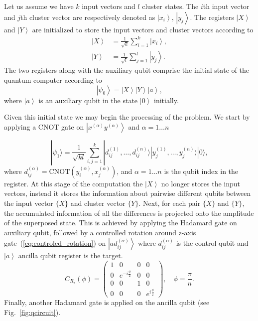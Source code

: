 \documentclass[pra,showkeys,twocolumn,showpacs]{revtex4-1}
\begin{document}
Let us assume we have $k$ input vectors and $l$ cluster states. 
The $i$th input vector and $j$th cluster vector are respectively denoted as $\left| x_i \right\rangle$, $\left| y_j \right\rangle$. 
The registers $\left| X \right\rangle$ and $\left| Y \right\rangle$ are initialized to store the input vectors and cluster vectors according to
%
\begin{align}
    \label{eq:encodnig}
    \left| X \right\rangle  & = \frac{1}{\sqrt{k}} \sum\limits_{i=1}^{k} \left| x_i \right\rangle,  \\
    \left| Y \right\rangle&  = \frac{1}{\sqrt{l}} \sum\limits_{j=1}^{l} \left| y_j \right\rangle .
\end{align}
% 
The two registers along with the auxiliary qubit comprise the initial state of the quantum computer according to
%
\begin{equation} 
    \label{eq:initial_state}
	\left| \psi_0 \right\rangle = 
    \left| X \right\rangle
    \left| Y \right\rangle 
    \left| a \right\rangle ,
\end{equation}
%
where $\left| a \right\rangle$ is an auxiliary qubit in the state $\left| 0 \right\rangle$ initially.

Given this initial state we may begin the processing of the problem. We start by applying a CNOT gate on $\left| x^{(\alpha)} y^{(\alpha)} \right\rangle$ and $\alpha = 1 \dots n$

\begin{equation}
    | \psi_1 \rangle  =  
    \frac{1}{\sqrt{kl}} \sum_{i, j=1}^{k} 
    | d^{(1)}_{ij}, \dots, d^{(n)}_{ij} \rangle 
    | y^{(1)}_j, \dots, y^{(n)}_j \rangle
    | 0 \rangle ,
\end{equation}
%
where $d^{(\alpha)}_{ij} = \mathrm{CNOT}(y^{(\alpha)}_i, x^{(\alpha)}_j)$, and $\alpha = 1 \dots n$  is the qubit index in the register. 
At this stage of the computation the $\left| X \right\rangle$ no longer stores the input vectors,
instead it stores the information about pairwise different qubits between the input vector $\{X\}$ and cluster vector $\{Y\}$. 
Next, for each pair $\{X\}$ and $\{Y\}$, the accumulated information of all the differences is projected onto the amplitude of the superposed state. 
This is achieved by applying the Hadamard gate on auxiliary qubit, 
followed by a controlled rotation around z-axis gate~(\ref{eq:controled_rotation}) on $\left|a d_{ij}^{(\alpha)}\right\rangle$ 
where $d_{ij}^{(\alpha)}$ is the control qubit and $\left| a \right\rangle$ ancilla qubit register is the target.
%
\begin{equation}
    \label{eq:controled_rotation}
    C_{R_z}(\phi) = 
    \begin{pmatrix}
        1 & 0 & 0 & 0 \\
        0 & e^{-i \frac \phi 2} & 0 & 0 \\
        0 & 0 & 1 & 0 \\
		0 & 0 & 0 & e^{i \frac \phi 2}
    \end{pmatrix} ,
    \quad \phi = \frac{\pi}{n}.
\end{equation}
%
Finally, another Hadamard gate is applied on the ancilla qubit (see Fig.~\ref{fig:qcircuit}). 
\end{document}

